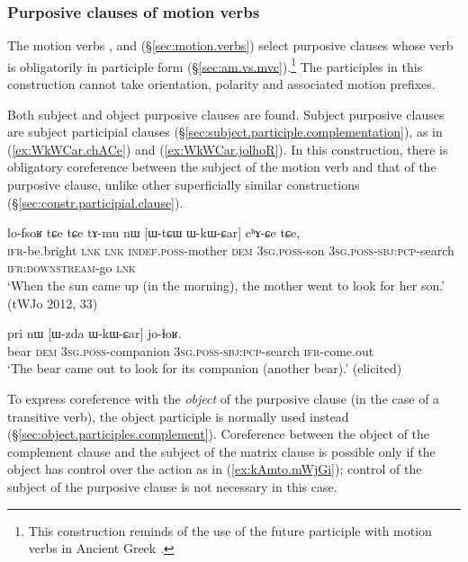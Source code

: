 \subsubsection{Purposive clauses of motion verbs} \label{sec:purposive.clause.motion.verbs}
The motion verbs ,  and   (§\ref{sec:motion.verbs}) select purposive clauses whose verb is obligatorily in participle form (§\ref{sec:am.vs.mvc}).\footnote{This construction reminds of the use of the future participle with motion verbs in Ancient Greek \citep[§177.B]{vernhes96hermaion}. } The participles in this construction cannot take orientation, polarity and associated motion prefixes.

Both subject and object purposive clauses are found. Subject purposive clauses are subject participial clauses (§\ref{sec:subject.participle.complementation}), as in (\ref{ex:WkWCar.chACe}) and (\ref{ex:WkWCar.jolhoR}). In this construction, there is obligatory coreference between the subject of the motion verb and that of the purposive clause, unlike other superficially similar constructions (§\ref{sec:constr.participial.clause}).

\begin{exe}
	\ex \label{ex:WkWCar.chACe}
	\gll lo-fsoʁ tɕe tɕe tɤ-mu nɯ [ɯ-tɕɯ ɯ-kɯ-ɕar] cʰɤ-ɕe tɕe,\\
	\textsc{ifr}-be.bright \textsc{lnk} \textsc{lnk} \textsc{indef}.\textsc{poss}-mother \textsc{dem} \textsc{3sg}.\textsc{poss}-son \textsc{3sg}.\textsc{poss}-\textsc{sbj}:\textsc{pcp}-search \textsc{ifr}:\textsc{downstream}-go \textsc{lnk} \\
	\glt `When the sun came up (in the morning), the mother went to look for her son.' (tWJo 2012, 33)
\end{exe}

\begin{exe}
	\ex \label{ex:WkWCar.jolhoR}
	\gll pri nɯ [ɯ-zda ɯ-kɯ-ɕar] jo-ɬoʁ. \\
	bear \textsc{dem} \textsc{3sg}.\textsc{poss}-companion \textsc{3sg}.\textsc{poss}-\textsc{sbj}:\textsc{pcp}-search \textsc{ifr}-come.out \\
	\glt `The bear came out to look for its companion (another bear).' (elicited)
\end{exe}

To express coreference with the \textit{object} of the purposive clause (in the case of a transitive verb), the object participle is normally used instead (§\ref{sec:object.participles.complement}).  Coreference between the object of the complement clause and the subject of the matrix clause is possible only if the object has control over the action as in (\ref{ex:kAmto.mWjGi}); control of the subject of the purposive clause is not necessary in this case.


